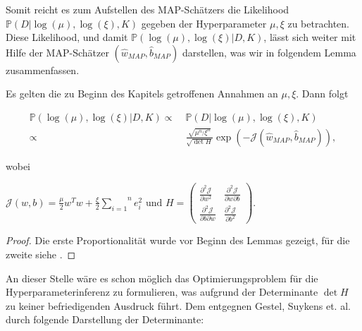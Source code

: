Somit reicht es zum Aufstellen des MAP-Schätzers die Likelihood  $\mathbb{P}(D\vert \log(\mu),\log(\xi),K)$ gegeben der Hyperparameter $\mu, \xi$ zu betrachten. Diese Likelihood, und damit $\mathbb{P}(\log(\mu), \log(\xi)\vert D, K)$, lässt sich weiter mit Hilfe der MAP-Schätzer $(\hat{w}_{MAP}, \hat{b}_{MAP})$ darstellen, was wir in folgendem Lemma zusammenfassen.

\begin{lemma}

Es gelten die zu Beginn des Kapitels getroffenen Annahmen an $\mu, \xi$. Dann folgt

\begin{align*}
	\mathbb{P}(\log(\mu), \log(\xi)\vert D, K) \propto\; & \mathbb{P}(D\vert \log(\mu),			\log(\xi),K) \\
	\propto\; & \frac{\sqrt{\mu^{n_f} \xi^n}}	{\sqrt{\det H}} \exp(- \mathcal{J}(\hat{w}			_{MAP},\hat{b}_{MAP})),
\end{align*}

wobei 
\begin{center}
	$\mathcal{J}(w,b) = \frac{\mu}{2}w^T w + \frac{\xi}{2}\overset{n}{\underset{i=1}			{\sum}} e_i ^2 \text{ und } H = \begin{pmatrix}
	\frac{\partial^2 \mathcal{J}}{\partial w^2 } & \frac{\partial^2 \mathcal{J}}				{\partial w \partial b } \\
	\frac{\partial^2 \mathcal{J}}{\partial b \partial w } & \frac{\partial^2 					\mathcal{J}}{\partial b^2 }
	\end{pmatrix}.$
\end{center}

\end{lemma}

\begin{proof}
Die erste Proportionalität wurde vor Beginn des Lemmas gezeigt, für die zweite siehe \cite{LS-SVM}.
\end{proof}

An dieser Stelle wäre es schon möglich das Optimierungsproblem für die Hyperparameterinferenz zu formulieren, was aufgrund der Determinante $\det H$ zu keiner befriedigenden Ausdruck führt. Dem entgegnen Gestel, Suykens et. al. durch folgende Darstellung der Determinante:

